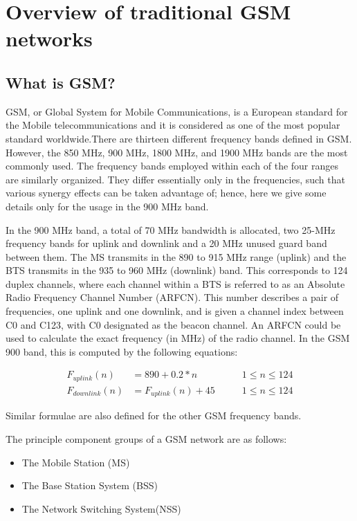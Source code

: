 \chapter{Overview of traditional GSM networks}

\section{What is GSM?}
GSM, or Global System for Mobile Communications,  is a European standard for 
the Mobile telecommunications and it is considered as one of the most popular
standard worldwide.There are thirteen different frequency bands defined in GSM.
However, the 850 MHz, 900 MHz, 1800 MHz, and 1900 MHz bands are the most 
commonly used. The frequency bands employed within each of the four ranges are 
similarly organized. They differ essentially only in the frequencies, such that 
various synergy effects can be taken advantage of; hence, here we give some 
details only for the usage in the 900 MHz band.


In the 900 MHz band, a total of 70 MHz bandwidth is allocated, two 25-MHz 
frequency bands for uplink and downlink and a 20 MHz unused guard band between 
them. The MS transmits in the 890 to 915 MHz range (uplink) and the BTS 
transmits in the 935 to 960 MHz (downlink) band. This corresponds to 124 duplex
channels, where each channel within a BTS is referred to as an Absolute Radio 
Frequency Channel Number (ARFCN). This number describes a pair of frequencies, 
one uplink and one downlink, and is given a channel index between C0 and C123, 
with C0 designated as the beacon channel. An ARFCN could be used to calculate 
the exact frequency (in MHz) of the radio channel. In the GSM 900 band, this is 
computed by the following equations:

\begin{align}
F_{uplink}(n) &= 890 + 0.2*n \qquad & 1\leq{}n\leq{}124 \nonumber\\
F_{downlink}(n) &= F_{uplink}(n) + 45  \qquad & 1\leq{}n\leq{}124 \nonumber
\end{align}

Similar formulae are also defined for the other GSM frequency bands.


The principle component groups of a GSM network are as follows:
\begin{itemize}
	\item The Mobile Station (MS)
	\item The Base Station System (BSS)
	\item The Network Switching System(NSS)
\end{itemize}


